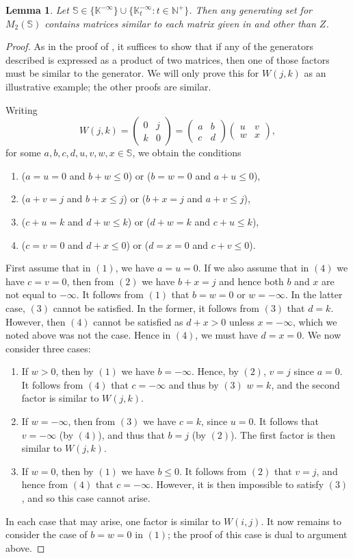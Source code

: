 \documentclass[11pt]{article}
\newtheorem{lemma}[thm]{Lemma}
\numberwithin{equation}{section}
\newcommand{\set}[2]{\ensuremath{\{#1 : #2 \}}}
\renewcommand{\S}{\mathbb{S}}
\newcommand{\N}{\mathbb{N}}
\newcommand{\Np}{\N^{+}}
\newcommand{\K}{\mathbb{K}}
\newcommand{\Kmax}{\K^{-\infty}}
\newcommand{\Kmaxt}{\K^{-\infty}_t}
\newcommand{\mat}[4]{\begin{pmatrix}#1&#2\\#3&#4\end{pmatrix}}
\begin{document}
\begin{lemma}
  Let $\S \in \{\Kmax\} \cup \set{\Kmaxt}{t \in \Np}$. Then any generating
  set for $M_{2}(\S)$ contains matrices similar to each matrix given in
   and  other than $Z$.
\end{lemma}
\begin{proof}
  As in the proof of , it suffices to show
  that if any of the generators described is expressed as a product of two
  matrices, then one of those factors must be similar to the generator. We will
  only prove this for $W(j, k)$ as an illustrative example; the other proofs are
  similar.

  Writing 
  \[W(j, k) = \mat{0}{j}{k}{0} = \mat{a}{b}{c}{d} \mat{u}{v}{w}{x},\]
  for some $a,b,c,d,u,v,w,x \in \S$, we obtain the conditions
  \begin{enumerate}
    \item
      ($a = u = 0$ and $b + w \leq 0$) or ($b = w = 0$ and $a + u \leq 0$),
    \item
      ($a + v = j$ and $b + x \leq j$) or ($b + x = j$ and $a + v \leq j$),
    \item
      ($c + u = k$ and $d + w \leq k$) or ($d + w = k$ and $c + u \leq k$),
    \item
      ($c = v = 0$ and $d + x \leq 0$) or ($d = x = 0$ and $c + v \leq 0$).
  \end{enumerate}
  First assume that in $(1)$, we have $a = u = 0$. If we also assume that in
  $(4)$ we have $c = v = 0$, then from $(2)$ we have $b + x = j$ and hence both
  $b$ and $x$ are not equal to $-\infty$. It follows from $(1)$ that $b = w = 0$
  or $w = -\infty$. In the latter case, $(3)$ cannot be satisfied. In the
  former, it follows from $(3)$ that $d = k$. However, then $(4)$ cannot be
  satisfied as $d + x > 0$ unless $x = -\infty$, which we noted above was not
  the case. Hence in $(4)$, we must have $d = x = 0$. We now consider three
  cases:
  \begin{enumerate}
    \item
      If $w > 0$, then by $(1)$ we have $b = -\infty$. Hence, by $(2)$, $v = j$
      since $a = 0$. It follows from $(4)$ that $c = -\infty$ and thus by $(3)$
      $w = k$, and the second factor is similar to $W(j, k)$.
    \item
      If $w = -\infty$, then from $(3)$ we have $c = k$, since $u = 0$. It
      follows that $v = -\infty$ (by $(4)$), and thus that $b = j$ (by $(2)$).
      The first factor is then similar to $W(j, k)$.
    \item
      If $w = 0$, then by $(1)$ we have $b \leq 0$. It follows from $(2)$ that
      $v = j$, and hence from $(4)$ that $c = -\infty$. However, it is then
      impossible to satisfy $(3)$, and so this case cannot arise.
  \end{enumerate}
  In each case that may arise, one factor is similar to $W(i, j)$. It now
  remains to consider the case of $b = w = 0$ in $(1)$; the proof of this case
  is dual to argument above.
\end{proof}
\end{document}
